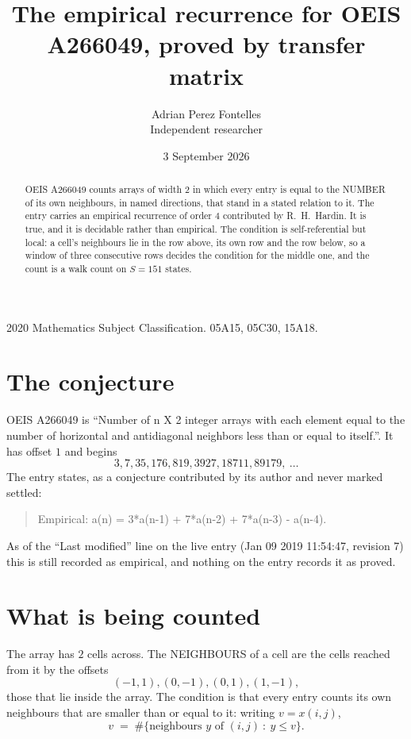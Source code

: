 \documentclass[11pt,a4paper]{article}
\title{The empirical recurrence for OEIS A266049, proved by transfer matrix}
\author{Adrian Perez Fontelles\\ \small Independent researcher}
\date{3 September 2026}
\theoremstyle{plain}
\theoremstyle{definition}
\begin{document}
\maketitle

\begin{abstract}
OEIS A266049 counts arrays of width $2$ in which every entry is equal to the NUMBER of its own
neighbours, in named directions, that stand in a stated relation to it. The entry carries an
empirical recurrence of order $4$ contributed by R.~H.~Hardin. It is true, and it is
decidable rather than empirical. The condition is self-referential but local: a cell's
neighbours lie in the row above, its own row and the row below, so a window of three
consecutive rows decides the condition for the middle one, and the count is a walk count on
$S=151$ states.
\end{abstract}

\noindent\small 2020 Mathematics Subject Classification. 05A15, 05C30, 15A18.\normalsize

\section{The conjecture}

OEIS A266049 is ``Number of n X 2 integer arrays with each element equal to the number of horizontal and antidiagonal neighbors less than or equal to itself.''. It has offset $1$ and begins
\[
3, 7, 35, 176, 819, 3927, 18711, 89179,\ \dots
\]
The entry states, as a conjecture contributed by its author and never marked settled:
\begin{quote}
Empirical: a(n) = 3*a(n-1) + 7*a(n-2) + 7*a(n-3) - a(n-4).
\end{quote}
As of the ``Last modified'' line on the live entry (Jan 09 2019 11:54:47, revision 7) this is still
recorded as empirical, and nothing on the entry records it as proved.

\section{What is being counted}

The array has $2$ cells across. The NEIGHBOURS of a cell are the cells reached from it by the
offsets
\[
(-1,1), (0,-1), (0,1), (1,-1),
\]
those that lie inside the array. The condition is that every entry counts its own neighbours
that are smaller than or equal to it: writing $v=x(i,j)$,
\[
v\;=\;\#\{\text{neighbours } y \text{ of } (i,j)\ :\ y\le v\} .
\]
\end{document}
